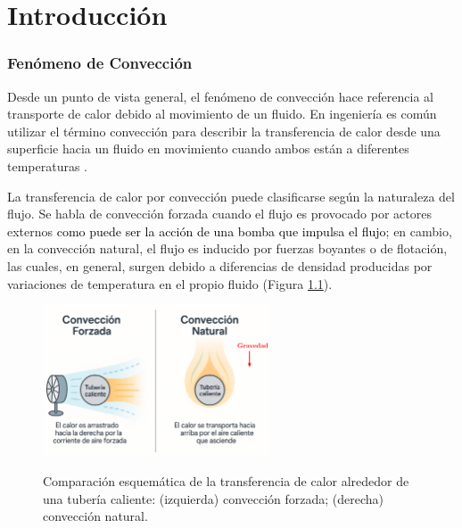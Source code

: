 \chapter{Introducción}
\label{cap:intro}


\subsection*{Fenómeno de Convección}

Desde un punto de vista general, el fenómeno de convección hace referencia al transporte de calor debido al movimiento de un fluido. En ingeniería es común utilizar el término convección para describir la transferencia de calor desde una superficie hacia un fluido en movimiento cuando ambos están a diferentes temperaturas \cite{cengelheat,incropera}. 

La transferencia de calor por convección puede clasificarse según la naturaleza del flujo. Se habla de convección forzada cuando el flujo es provocado por actores externos \textcolor{black}{como puede ser la acción de una bomba que impulsa el flujo}; en cambio, en la convección natural, el flujo es inducido por fuerzas boyantes o de flotación, las cuales, en general, surgen debido a diferencias de densidad producidas por variaciones de temperatura en el propio fluido (Figura \ref{fig:natural_forzada}).



\begin{figure}[H]
 \centering
    \includegraphics[width=0.6\textwidth]{figures/cap1/natural_forzada.eps}
    \label{fig:natural_forzada} 
 \caption{Comparación esquemática de la transferencia de calor alrededor de una tubería caliente: (izquierda) convección forzada; (derecha) convección natural.} 
 \label{fig:natural_forzada}
\end{figure}

